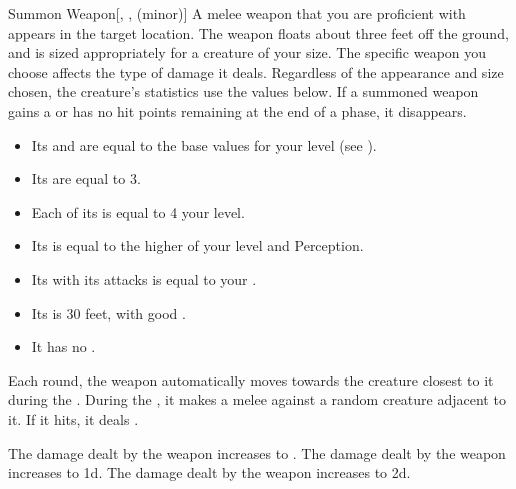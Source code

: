 \lowercase{\hypertarget{spell:Summon Weapon}{}}\label{spell:Summon Weapon}
\begin{freeability}[Rank 1]{\hypertarget{spell:Summon Weapon}{Summon Weapon}}[, ,  (minor)]
A melee weapon that you are proficient with appears in the target location.
The weapon floats about three feet off the ground, and is sized appropriately for a creature of your size.
The specific weapon you choose affects the type of damage it deals.
Regardless of the appearance and size chosen, the creature's statistics use the values below.
If a summoned weapon gains a  or has no hit points remaining at the end of a phase, it disappears.
\begin{itemize}
\item Its  and  are equal to the base values for your level (see ).
\item Its  are equal to 3.
\item Each of its  is equal to 4 \add your level.
\item Its  is equal to the higher of your level and Perception.
\item Its  with its attacks is equal to your  .
\item Its  is 30 feet, with good .
\item It has no .
\end{itemize}

Each round, the weapon automatically moves towards the creature closest to it during the .
During the , it makes a melee  against a random creature adjacent to it.
If it hits, it deals .

\rankline
{} The damage dealt by the weapon increases to .
 The damage dealt by the weapon increases to  \plus1d.
 The damage dealt by the weapon increases to  \plus2d.
\end{freeability}
\vspace{0.25em}



